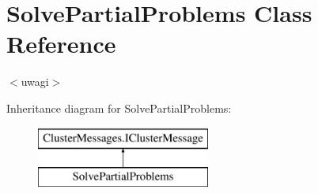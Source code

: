 \hypertarget{class_solve_partial_problems}{}\section{Solve\+Partial\+Problems Class Reference}
\label{class_solve_partial_problems}


$<$uwagi$>$  


Inheritance diagram for Solve\+Partial\+Problems\+:\begin{figure}[H]
\begin{center}
\leavevmode
\includegraphics[height=2.000000cm]{class_solve_partial_problems}
\end{center}
\end{figure}

